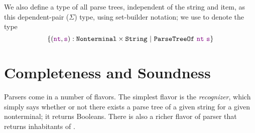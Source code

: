     We also define a type of all parse trees, independent of the string and item, as this dependent-pair ($\Sigma$) type, using set-builder notation; we use  to denote the type
    $$\left\{\oftype{(\farg{nt}, \farg{s})}{\typeprod{\Nonterminal}{\String}}\ \middle|\ \indname{ParseTreeOf}~\farg{nt}~\farg{s}\right\}$$
    
  \section{Completeness and Soundness}\label{sec:correctness}
      Parsers come in a number of flavors.  The simplest flavor is the \emph{recognizer}, which simply says whether or not there exists a parse tree of a given string for a given nonterminal; it returns Booleans.  There is also a richer flavor of parser that returns inhabitants of .
  
